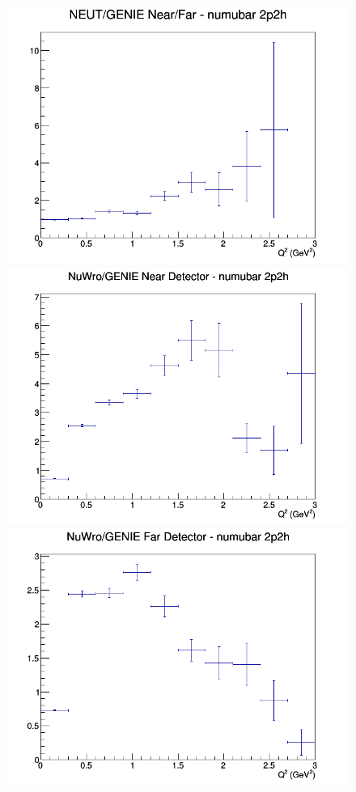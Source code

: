 \begin{figure}[h]
\endminipage
{}
\includegraphics[width=\linewidth]{eff_Q2/LAr/ratios/2p2h_NEUT_GENIE_numubar_NF_Q2.png}
\endminipage
\newline
{}
\includegraphics[width=\linewidth]{eff_Q2/LAr/ratios/2p2h_NuWro_GENIE_numubar_near_Q2.png}
\endminipage
{}
\includegraphics[width=\linewidth]{eff_Q2/LAr/ratios/2p2h_NuWro_GENIE_numubar_far_Q2.png}

\end{figure}
